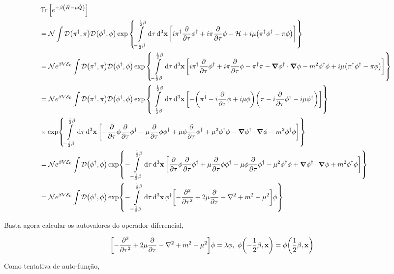 \documentclass[twoside]{amsart}
\newcommand{\Dd}[1]{\mathcal D #1}
\numberwithin{equation}{section}
\begin{document}
\begin{align}
    &\Tr\qty[e^{-\beta\qty(\hat H-\mu \hat Q)}]\\
    &=\mathcal N\int\Dd\qty(\pi^\dagger,\pi)\Dd\qty(\phi^\dagger,\phi)\exp\qty{\int\limits_{-\frac12\beta}^{\frac12\beta}\dd{\tau}\dd[3]{\vb x}\qty[i\pi^\dagger\pdv{}{\tau}\phi^\dagger+i\pi\pdv{}{\tau}\phi-\mathcal H+i\mu\qty(\pi^\dagger\phi^\dagger-\pi\phi)]}\\
    &=\mathcal Ne^{\beta V\mathcal E_0}\int\Dd\qty(\pi^\dagger,\pi)\Dd\qty(\phi^\dagger,\phi)\exp\qty{\int\limits_{-\frac12\beta}^{\frac12\beta}\dd{\tau}\dd[3]{\vb x}\qty[i\pi^\dagger\pdv{}{\tau}\phi^\dagger+i\pi\pdv{}{\tau}\phi-\pi^\dagger\pi-\grad\phi^\dagger\cdot\grad\phi-m^2\phi^\dagger\phi+i\mu\qty(\pi^\dagger\phi^\dagger-\pi\phi)]}\\
    &=\mathcal Ne^{\beta V\mathcal E_0}\int\Dd\qty(\pi^\dagger,\pi)\Dd\qty(\phi^\dagger,\phi)\exp\qty{\int\limits_{-\frac12\beta}^{\frac12\beta}\dd{\tau}\dd[3]{\vb x}\qty[-\qty(\pi^\dagger-i\pdv{}{\tau}\phi+i\mu\phi)\qty(\pi-i\pdv{}{\tau}\phi^\dagger-i\mu\phi^\dagger)]}\\
    &\times\exp{\int\limits_{-\frac12\beta}^{\frac12\beta}\dd{\tau}\dd[3]{\vb x}\qty[-\pdv{}{\tau}\phi\pdv{}{\tau}\phi^\dagger-\mu\pdv{}{\tau}\phi\phi^\dagger+\mu\phi\pdv{}{\tau}\phi^\dagger+\mu^2\phi^\dagger\phi-\grad\phi^\dagger\cdot\grad\phi-m^2\phi^\dagger\phi]}\nonumber\\
    &=\mathcal Ne^{\beta V\mathcal E_0}\int\Dd\qty(\phi^\dagger,\phi)\exp{-\int\limits_{-\frac12\beta}^{\frac12\beta}\dd{\tau}\dd[3]{\vb x}\qty[\pdv{}{\tau}\phi\pdv{}{\tau}\phi^\dagger+\mu\pdv{}{\tau}\phi\phi^\dagger-\mu\phi\pdv{}{\tau}\phi^\dagger-\mu^2\phi^\dagger\phi+\grad\phi^\dagger\cdot\grad\phi+m^2\phi^\dagger\phi]}\\
    &=\mathcal Ne^{\beta V\mathcal E_0}\int\Dd\qty(\phi^\dagger,\phi)\exp{-\int\limits_{-\frac12\beta}^{\frac12\beta}\dd{\tau}\dd[3]{\vb x}\phi^\dagger\qty[-\pdv[2]{}{\tau}+2\mu\pdv{}{\tau}-\laplacian+m^2-\mu^2]\phi}
\end{align}

Basta agora calcular os autovalores do operador diferencial,

\begin{align}
    \qty[-\pdv[2]{}{\tau}+2\mu\pdv{}{\tau}-\laplacian+m^2-\mu^2]\phi&=\lambda\phi,\ \phi\qty(-\frac12\beta,\vb x)=\phi\qty(\frac12\beta,\vb x)
\end{align}

Como tentativa de auto-função,
\end{document}
